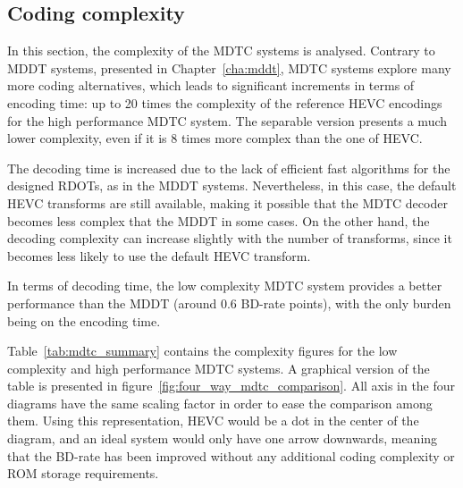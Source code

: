 \documentclass[11pt,a4paper,openright,twoside]{book}
\numberwithin{equation}{section} %
\numberwithin{figure}{section} %
\numberwithin{table}{section} %
\begin{document}
\subsection{Coding complexity}
\label{sub:mdtc_coding_complexity}

In this section, the complexity of the \ac{MDTC} systems is analysed.
Contrary to \ac{MDDT} systems, presented in Chapter~\ref{cha:mddt}, \ac{MDTC}
systems explore many more coding alternatives, which leads to significant
increments in terms of encoding time:
up to 20 times the complexity of the reference \ac{HEVC} encodings for the
high performance \acs{MDTC} system.
The separable version presents a much lower complexity, even if it is 8 times
more complex than the one of \ac{HEVC}.

The decoding time is increased due to the lack of efficient fast algorithms
for the designed \acp{RDOT}, as in the \ac{MDDT} systems.
Nevertheless, in this case, the default \ac{HEVC} transforms are still
available, making it possible that the \ac{MDTC} decoder becomes less complex
that the \ac{MDDT} in some cases.
On the other hand, the decoding complexity can increase slightly with the
number of transforms, since it becomes less likely to use the default
\ac{HEVC} transform.

In terms of decoding time, the low complexity \ac{MDTC} system provides a
better performance than the \ac{MDDT} (around 0.6 \ac{BD}-rate points), with
the only burden being on the encoding time.

Table~\ref{tab:mdtc_summary} contains the complexity figures for the low
complexity and high performance \ac{MDTC} systems.
A graphical version of the table is presented in
figure~\ref{fig:four_way_mdtc_comparison}.
All axis in the four diagrams have the same scaling factor in order to ease
the comparison among them.
Using this representation, \acs{HEVC} would be a dot in the center of the
diagram, and an ideal system would only have one arrow downwards, meaning that
the \acs{BD}-rate has been improved without any additional coding complexity
or \acs{ROM} storage requirements.
\end{document}
